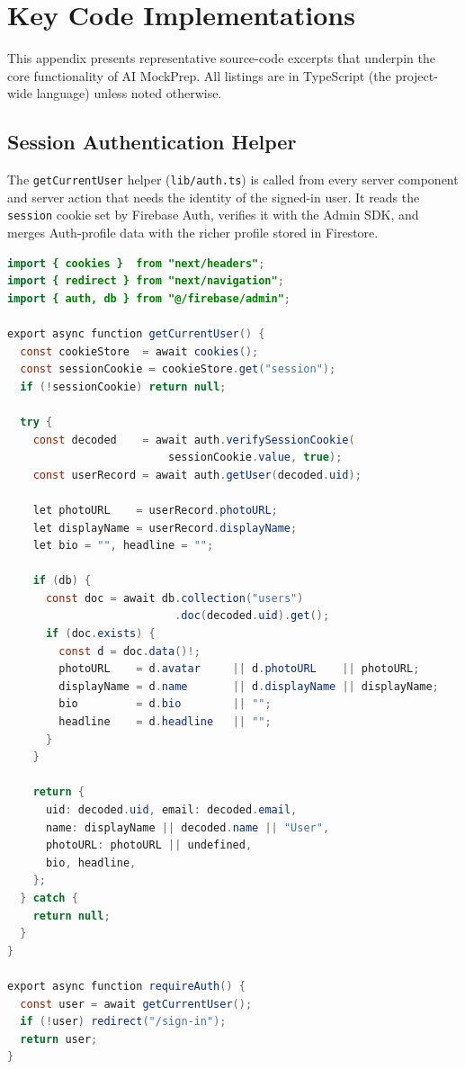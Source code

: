 
\chapter{Key Code Implementations}
\label{app:code}

This appendix presents representative source-code excerpts that underpin the
core functionality of AI MockPrep.  All listings are in TypeScript (the
project-wide language) unless noted otherwise.

\section{Session Authentication Helper}
\label{app:auth}

The \texttt{getCurrentUser} helper (\texttt{lib/auth.ts}) is called from every
server component and server action that needs the identity of the signed-in
user.  It reads the \texttt{session} cookie set by Firebase Auth, verifies it
with the Admin SDK, and merges Auth-profile data with the richer profile stored
in Firestore.

\begin{lstlisting}[language=Java,
  caption={Session verification and user-profile resolution (\texttt{lib/auth.ts})},
  label={lst:getCurrentUser}]
import { cookies }  from "next/headers";
import { redirect } from "next/navigation";
import { auth, db } from "@/firebase/admin";

export async function getCurrentUser() {
  const cookieStore  = await cookies();
  const sessionCookie = cookieStore.get("session");
  if (!sessionCookie) return null;

  try {
    const decoded    = await auth.verifySessionCookie(
                         sessionCookie.value, true);
    const userRecord = await auth.getUser(decoded.uid);

    let photoURL    = userRecord.photoURL;
    let displayName = userRecord.displayName;
    let bio = "", headline = "";

    if (db) {
      const doc = await db.collection("users")
                          .doc(decoded.uid).get();
      if (doc.exists) {
        const d = doc.data()!;
        photoURL    = d.avatar     || d.photoURL    || photoURL;
        displayName = d.name       || d.displayName || displayName;
        bio         = d.bio        || "";
        headline    = d.headline   || "";
      }
    }

    return {
      uid: decoded.uid, email: decoded.email,
      name: displayName || decoded.name || "User",
      photoURL: photoURL || undefined,
      bio, headline,
    };
  } catch {
    return null;
  }
}

export async function requireAuth() {
  const user = await getCurrentUser();
  if (!user) redirect("/sign-in");
  return user;
}
\end{lstlisting}

